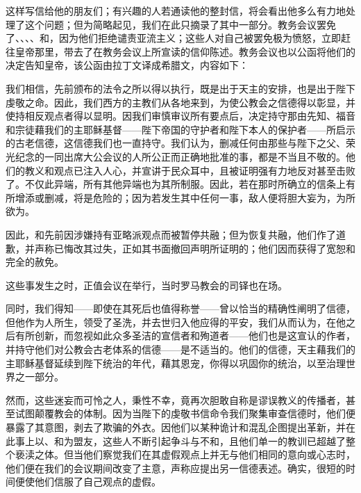 这样写信给他的朋友们；有兴趣的人若通读他的整封信，将会看出他多么有力地处理了这个问题；但为简略起见，我们在此只摘录了其中一部分。教务会议罢免了、、、、和，因为他们拒绝谴责亚流主义；这些人对自己被罢免极为愤怒，立即赶往皇帝那里，带去了在教务会议上所宣读的信仰陈述。教务会议也以公函将他们的决定告知皇帝，该公函由拉丁文译成希腊文，内容如下：\par

\par

我们相信，先前颁布的法令之所以得以执行，既是出于天主的安排，也是出于陛下虔敬之命。因此，我们西方的主教们从各地来到，为使公教会之信德得以彰显，并使持相反观点者得以显明。因我们审慎审议所有要点后，决定持守那由先知、福音和宗徒藉我们的主耶稣基督——陛下帝国的守护者和陛下本人的保护者——所启示的古老信德，这信德我们也一直持守。我们认为，删减任何由那些与陛下之父、荣光纪念的一同出席大公会议的人所公正而正确地批准的事，都是不当且不敬的。他们的教义和观点已注入人心，并宣讲于民众耳中，且被证明强有力地反对甚至击败了。不仅此异端，所有其他异端也为其所制服。因此，若在那时所确立的信条上有所增添或删减，将是危险的；因为若发生其中任何一事，敌人便将胆大妄为，为所欲为。\par

因此，和先前因涉嫌持有亚略派观点而被暂停共融；但为恢复共融，他们作了道歉，并声称已悔改其过失，正如其书面撤回声明所证明的；他们因而获得了宽恕和完全的赦免。\par

这些事发生之时，正值会议在举行，当时罗马教会的司铎也在场。\par

同时，我们得知——即使在其死后也值得称誉——曾以恰当的精确性阐明了信德，但他作为人所生，领受了圣洗，并去世归入他应得的平安，我们从而认为，在他之后有所创新，而忽视如此众多圣洁的宣信者和殉道者——他们也是这宣认的作者，并持守他们对公教会古老体系的信德——是不适当的。他们的信德，天主藉我们的主耶稣基督延续到陛下统治的年代，藉其恩宠，你得以巩固你的统治，以至治理世界之一部分。\par

然而，这些迷妄而可怜之人，秉性不幸，竟再次胆敢自称是谬误教义的传播者，甚至试图颠覆教会的体制。因为当陛下的虔敬书信命令我们聚集审查信德时，他们便暴露了其意图，剥去了欺骗的外衣。因他们以某种诡计和混乱企图提出革新，并在此事上以、和为盟友，这些人不断引起争斗与不和，且他们单一的教训已超越了整个亵渎之体。但当他们察觉我们在其虚假观点上并无与他们相同的意向或心志时，他们便在我们的会议期间改变了主意，声称应提出另一信德表述。确实，很短的时间便使他们信服了自己观点的虚假。\par

